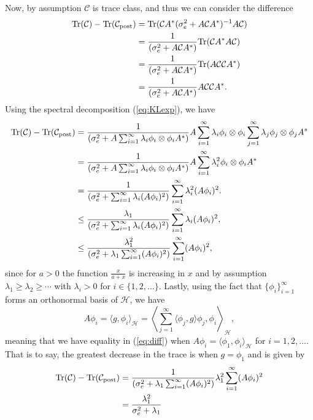 \documentclass[pdflatex,sn-mathphys-num]{sn-jnl}
\theoremstyle{thmstyleone}%
\theoremstyle{thmstyletwo}%
\theoremstyle{thmstylethree}%
\begin{document}
Now, by assumption $\mathcal{C}$ is trace class, and thus we can consider the difference
\begin{align}
    \text{Tr}(\mathcal{C})-\text{Tr}(\mathcal{C}_{\rm post})&=\text{Tr}(\mathcal{C}A^\ast(\sigma_e^2+A\mathcal{C}A^\ast)^{-1}A\mathcal{C})\nonumber\\
    &=\frac{1}{(\sigma_e^2+A\mathcal{C}A^\ast)}\text{Tr}(\mathcal{C}A^\ast A\mathcal{C})\nonumber\\
    &=\frac{1}{(\sigma_e^2+A\mathcal{C}A^\ast)}\text{Tr}( A\mathcal{C}\mathcal{C}A^\ast)\nonumber\\
    &=\frac{1}{(\sigma_e^2+A\mathcal{C}A^\ast)}  A\mathcal{C}\mathcal{C}A^\ast.\nonumber
\end{align}
Using the spectral decomposition (\ref{eq:KLexp}), we have
\begin{align}
    \text{Tr}(\mathcal{C})-\text{Tr}(\mathcal{C}_{\rm post})&=\frac{1}{(\sigma_e^2+A\sum_{i=1}^\infty\lambda_i\phi_i\otimes\phi_iA^\ast)} A\sum_{i=1}^\infty\lambda_i\phi_i\otimes\phi_i \sum_{j=1}^\infty\lambda_j\phi_j\otimes\phi_j A^\ast\nonumber\\
    &=\frac{1}{(\sigma_e^2+A\sum_{i=1}^\infty\lambda_i\phi_i\otimes\phi_iA^\ast)} A\sum_{i=1}^\infty\lambda_i^2\phi_i\otimes\phi_i  A^\ast\nonumber\\
    &=\frac{1}{(\sigma_e^2+\sum_{i=1}^\infty\lambda_i(A\phi_i)^2)}\sum_{i=1}^\infty\lambda_i^2(A\phi_i)^2.\nonumber\\
    &\leq \frac{\lambda_1}{(\sigma_e^2+\sum_{i=1}^\infty\lambda_i(A\phi_i)^2)}\sum_{i=1}^\infty\lambda_i(A\phi_i)^2,
    \nonumber\\
    &\leq \frac{\lambda_1^2}{(\sigma_e^2+\lambda_1\sum_{i=1}^\infty(A\phi_i)^2)}\sum_{i=1}^\infty(A\phi_i)^2,\label{eq:diff}
\end{align}
since for $a>0$ the function $\frac{x}{a+x}$ is increasing in $x$ and by assumption $\lambda_1\geq \lambda_2\geq\cdots$ with $\lambda_i>0$ for $i\in\{1,2,\dots\}.$ Lastly, using the fact that $\{\phi_i\}_{i=1}^{\infty}$ forms an orthonormal basis of $\mathcal{H}$, we have 
\[A\phi_i=\langle g,\phi_i\rangle_\mathcal{H}=\left\langle \sum_{j=1}^{\infty}\langle\phi_j,g\rangle\phi_j,\phi_i\right\rangle_\mathcal{H},\]
meaning that we have equality in (\ref{eq:diff}) when $A\phi_i=\langle \phi_1,\phi_i\rangle_\mathcal{H}$ for $i=1,2,\dots$. That is to say, the greatest decrease in the trace is when $g=\phi_1$ and is given by
\begin{align}
    \text{Tr}(\mathcal{C})-\text{Tr}(\mathcal{C}_{\rm post})&= \frac{1}{(\sigma_e^2+\lambda_1\sum_{i=1}^\infty(A\phi_i)^2)}\lambda_1^2\sum_{i=1}^\infty(A\phi_i)^2\nonumber\\
    &= \frac{\lambda_1^2}{\sigma_e^2+\lambda_1}\nonumber
\end{align}
\end{document}
